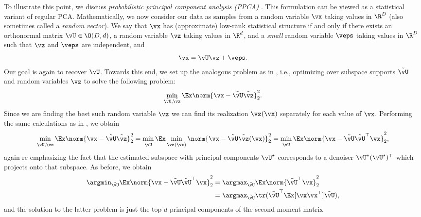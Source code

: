 \documentclass[../../book-main.tex]{subfiles}
\begin{document}
To illustrate this point, we discuss \textit{probabilistic principal
component analysis (PPCA)}
\citep{TippingM1999,DBLP:conf/nips/Roweis97}. This formulation can
be viewed as a statistical variant of regular PCA. Mathematically, we
now consider our data as samples from a random variable \(\vx\) taking
values in \(\R^{D}\) (also sometimes called a \textit{random vector}).
We say that \(\vx\) has (approximate) low-rank statistical structure if and
only if there exists an orthonormal matrix \(\vU \in \O(D, d)\), a
random variable \(\vz\) taking values in \(\R^{d}\), and a
\textit{small} random variable \(\veps\) taking values in \(\R^{D}\)
such that \(\vz\) and \(\veps\) are independent, and
\begin{equation}
    \vx = \vU\vz + \veps.
\end{equation}
Our goal is again to recover \(\vU\). Towards this end, we set up the
analogous problem as in , i.e., optimizing over
subspace supports \(\tilde{\vU}\) and random variables \(\vz\) to
solve the following problem:
\begin{equation}
    \min_{\tilde{\vU}, \tilde{\vz}}\Ex\norm{\vx -
    \tilde{\vU}\tilde{\vz}}_{2}^{2}.
\end{equation}
Since we are finding the best such random variable \(\vz\) we can
find its realization \(\vz(\vx)\) separately for each value of
\(\vx\). Performing the same calculations as in , we obtain %
\begin{equation}\label{eq:ppca_denoising}
    \min_{\tilde{\vU}, \tilde{\vz}}\Ex\norm{\vx -
    \tilde{\vU}\tilde{\vz}}_{2}^{2} =
    \min_{\tilde{\vU}}\Ex\min_{\tilde{\vz}(\vx)}\norm{\vx -
    \tilde{\vU}\tilde{\vz}(\vx)}_{2}^{2} =
    \min_{\tilde{\vU}}\Ex\norm{\vx - \tilde{\vU}\tilde{\vU}^{\top}\vx}_{2}^{2},
\end{equation}
again re-emphasizing the fact that the estimated subspace with
principal components \(\vU^{\star}\) corresponds to a denoiser
\(\vU^{\star}(\vU^{\star})^{\top}\) which projects onto that
subspace. As before, we obtain
\begin{align}\label{eq:PPCA}
    \argmin_{\tilde{\vU}}\Ex\norm{\vx -
    \tilde{\vU}\tilde{\vU}^{\top}\vx}_{2}^{2}
    &= \argmax_{\tilde{\vU}}\Ex\norm{\tilde{\vU}^{\top}\vx}_{2}^{2} \\
    &=
    \argmax_{\tilde{\vU}}\tr(\tilde{\vU}^{\top}\Ex[\vx\vx^{\top}]\tilde{\vU}),
\end{align}
and the solution to the latter problem is just the top \(d\)
principal components of the second moment matrix
\end{document}
